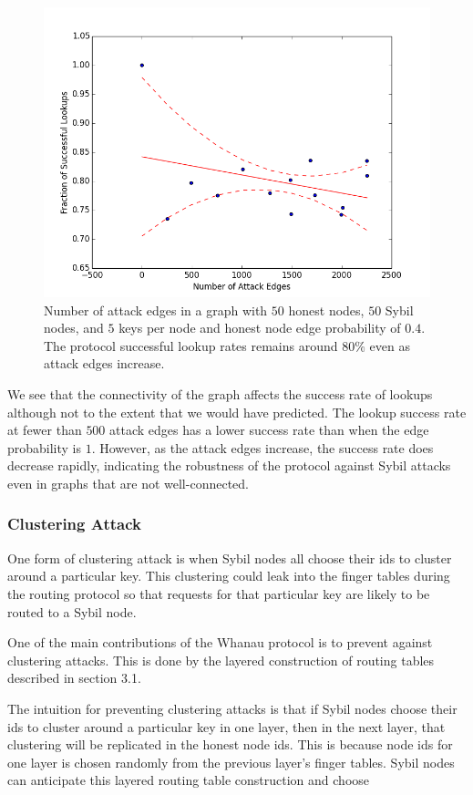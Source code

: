 \documentclass[letter]{article}
\begin{document}
\begin{figure}[!h]
\centering
\includegraphics[width=0.9\columnwidth]{4probattackedges}
\caption{Number of attack edges in a graph with $50$ honest nodes, $50$ Sybil nodes, and $5$ keys per node and honest node edge probability of $0.4$. The protocol successful lookup rates remains around $80\%$ even as attack edges increase.}
\label{fig:4probattackedges}
\end{figure}

We see that the connectivity of the graph affects the success rate of lookups although not to the extent that we would have predicted. The lookup success rate at fewer than $500$ attack edges has a lower success rate than when the edge probability is $1$. However, as the attack edges increase, the success rate does decrease rapidly, indicating the robustness of the protocol against Sybil attacks even in graphs that are not well-connected.
\subsubsection{Clustering Attack}

One form of clustering attack is when Sybil nodes all choose their ids to cluster
around a particular key. This clustering could leak into the finger tables during
the routing protocol so that requests for that particular key are likely to be routed to a Sybil node.

One of the main contributions of the Whanau protocol is to prevent against clustering attacks.
This is done by the layered construction of routing tables described in section 3.1.

The intuition for preventing clustering attacks is that if Sybil nodes
choose their ids to cluster around a particular key in one layer, then in
the next layer, that clustering will be replicated in the honest node ids.
This is because node ids for one layer is chosen randomly from the previous layer's finger tables.
Sybil nodes can anticipate this layered routing table construction and choose
\end{document}
